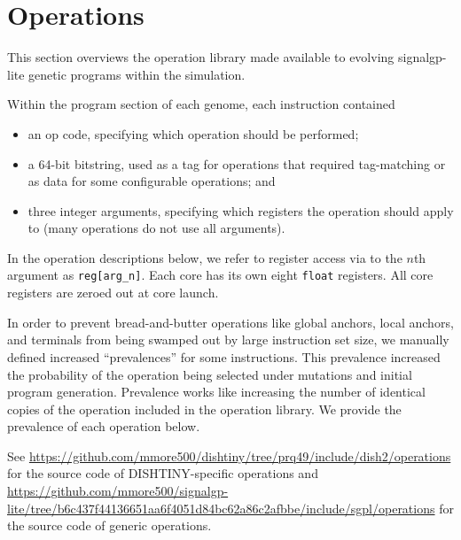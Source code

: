 \section{Operations}

\newcommand{\opdef}[2]{
    \begin{tabular}{|
        >{\columncolor[HTML]{C0C0C0}}l |l|}
        \hline
        Prevalence & #1 \\ \hline
        Num Args   & #2 \\ \hline
    \end{tabular}
}

This section overviews the operation library made available to evolving signalgp-lite genetic programs within the simulation.

Within the program section of each genome, each instruction contained
\begin{itemize}
\item an op code, specifying which operation should be performed;
\item a 64-bit bitstring, used as a tag for operations that required tag-matching or as data for some configurable operations; and
\item three integer arguments, specifying which registers the operation should apply to (many operations do not use all arguments).
\end{itemize}

In the operation descriptions below, we refer to register access via to the $n$th argument as \texttt{reg[arg\_n]}.
Each core has its own eight \texttt{float} registers.
All core registers are zeroed out at core launch.

In order to prevent bread-and-butter operations like global anchors, local anchors, and terminals from being swamped out by large instruction set size, we manually defined increased ``prevalences'' for some instructions.
This prevalence increased the probability of the operation being selected under mutations and initial program generation.
Prevalence works like increasing the number of identical copies of the operation included in the operation library.
We provide the prevalence of each operation below.

See \url{https://github.com/mmore500/dishtiny/tree/prq49/include/dish2/operations} for the source code of DISHTINY-specific operations and \url{https://github.com/mmore500/signalgp-lite/tree/b6c437f44136651aa6f4051d84bc62a86c2afbbe/include/sgpl/operations} for the source code of generic operations.

